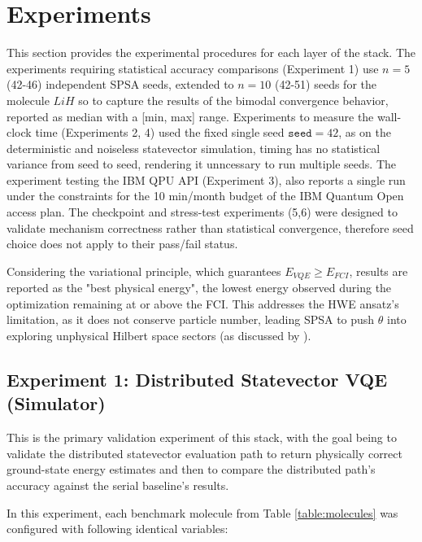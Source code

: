 \section{Experiments}
This section provides the experimental procedures for each layer of the stack. The experiments requiring statistical accuracy comparisons (Experiment 1) use $n=5$ (42-46) independent 
SPSA seeds, extended to $n=10$ (42-51) seeds for the molecule $LiH$ so to capture the results of the bimodal convergence behavior, reported as median with a [min, max] range. Experiments
to measure the wall-clock time (Experiments 2, 4) used the fixed single seed $\texttt{seed}=42$, as on the deterministic and noiseless statevector simulation, timing has no statistical variance from seed to seed, 
rendering it unncessary to run multiple seeds. The experiment testing the IBM QPU API (Experiment 3), also reports a single run under the constraints for the 10 min/month budget of the IBM Quantum Open 
access plan. The checkpoint and stress-test experiments (5,6) were designed to validate mechanism correctness rather than statistical convergence, therefore seed choice does not apply to their pass/fail status. 

Considering the variational principle, which guarantees $E_{VQE} \geq E_{FCI}$, results are reported as the "best physical energy", the lowest energy observed during 
the optimization remaining at or above the FCI. This addresses the HWE ansatz's limitation, as it does not conserve particle number, leading SPSA to push $\theta$
into exploring unphysical Hilbert space sectors (as discussed by \parencite{kandala2017hardware}).

\subsection{Experiment 1: Distributed Statevector VQE (Simulator)}
This is the primary validation experiment of this stack, with the goal being to validate the distributed statevector evaluation path to return 
physically correct ground-state energy estimates and then to compare the distributed path's accuracy against the serial baseline's results.

In this experiment, each benchmark molecule from Table \ref{table:molecules} was configured with following identical variables:

